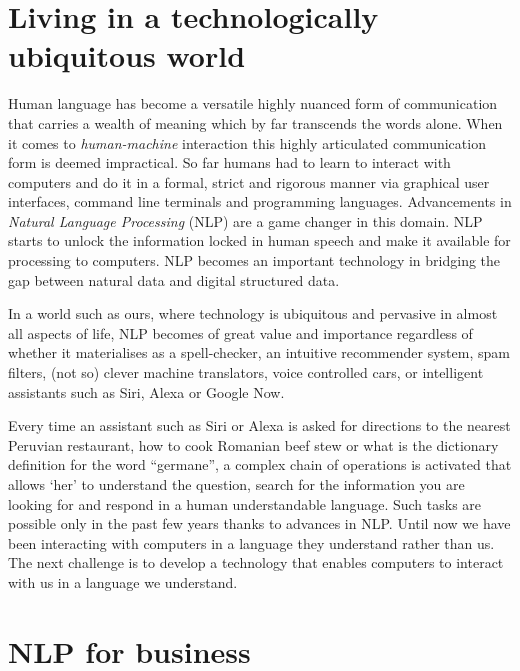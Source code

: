 \section{Living in a technologically ubiquitous world}
\label{sec:motivation}
    Human language has become a versatile highly nuanced form of communication that carries a wealth of meaning which by far transcends the words alone. When it comes to \textit{human-machine} interaction this highly articulated communication form is deemed impractical. So far humans had to learn to interact with computers and do it in a formal, strict and rigorous manner via graphical user interfaces, command line terminals and programming languages. Advancements in \textit{Natural Language Processing} (NLP) are a game changer in this domain. NLP starts to unlock the information locked in human speech and make it available for processing to computers. NLP becomes an important technology in bridging the gap between natural data and digital structured data.
    
    In a world such as ours, where technology is ubiquitous and pervasive in almost all aspects of life, NLP becomes of great value and importance regardless of whether it materialises as a spell-checker, an intuitive recommender system, spam filters, (not so) clever machine translators, voice controlled cars, or intelligent assistants such as Siri, Alexa or Google Now. 

    Every time an assistant such as Siri or Alexa is asked for directions to the nearest Peruvian restaurant, how to cook Romanian beef stew or what is the dictionary definition for the word ``germane'', a complex chain of operations is activated that allows `her' to understand the question, search for the information you are looking for and respond in a human understandable language. Such tasks are possible only in the past few years thanks to advances in NLP. Until now we have been interacting with computers in a language they understand rather than us. The next challenge is to develop a technology that enables computers to interact with us in a language we understand. %
    
\section{NLP for business}
\label{sec:motivation-business}
    
